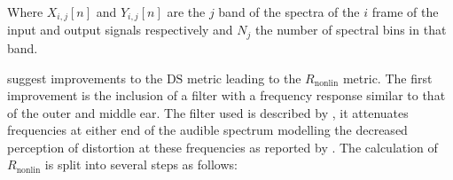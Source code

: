 		Where $X_{i,j}[n]$ and $Y_{i,j}[n]$ are the $j$ band of the spectra of the $i$ frame
		of the input and output signals respectively and $N_{j}$ the number of spectral bins in that band.
		
		\citet{tan2004predicting} suggest improvements to the $\mathrm{DS}$ metric leading to the
		$R_{\mathrm{nonlin}}$ metric. The first improvement is the inclusion of a filter with a frequency response
		similar to that of the outer and middle ear. The filter used is described by \citet{glasberg2002a}, it
		attenuates frequencies at either end of the audible spectrum modelling the decreased perception of
		distortion at these frequencies as reported by \citet{voishvillo2006assessment}. The calculation of
		$R_{\mathrm{nonlin}}$ is split into several steps as follows:
		
